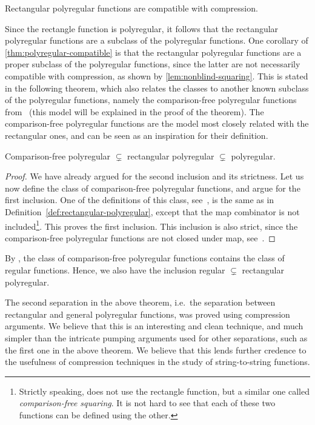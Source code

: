 \documentclass[a4paper,UKenglish,cleveref, autoref, thm-restate]{lipics-v2021}
\begin{document}
\begin{theorem}
    \label{thm:polyregular-compatible}
    Rectangular polyregular functions are compatible with compression.
\end{theorem}
Since the rectangle function is polyregular, it follows that the rectangular polyregular functions are a subclass of the polyregular functions. 
One corollary of \cref{thm:polyregular-compatible} is that the rectangular polyregular functions are a proper subclass of the polyregular functions, since the latter are not necessarily compatible with compression, as shown by \cref{lem:nonblind-squaring}. This is stated in the following theorem, which also relates the classes to another known subclass of the polyregular functions, namely the comparison-free polyregular functions from~\cite{NguyenNP21} (this model  will be explained in the proof of the theorem). The comparison-free polyregular functions are the model most closely related with the rectangular ones, and can be seen as an inspiration for their definition.

\begin{theorem}\label{thm:inclusions-on-classes} Comparison-free polyregular \; $\subsetneq$\; rectangular polyregular \; $\subsetneq$ \; polyregular.
\end{theorem}
\begin{proof}
    We have already argued for the second inclusion and its strictness. Let us now define the class of comparison-free polyregular functions, and argue for the first inclusion. One of the definitions of this class, see~\cite[Theorem~6.1]{NguyenNP21}, is the same as in Definition~\ref{def:rectangular-polyregular}, except that  the map combinator is not included\footnote{Strictly speaking, \cite[Theorem~6.1]{NguyenNP21} does not use the rectangle function, but a similar one called \emph{comparison-free squaring}. It is not hard to see that each of these two functions can be defined using the other. }. This proves the first inclusion. This inclusion is also strict, since  the comparison-free polyregular functions are not closed under map, see~\cite[Corollary~8.5]{NguyenNP21}.
\end{proof}
By \cite[Theorem 6.1]{NguyenNP21}, the class of comparison-free polyregular functions contains the class of regular functions. Hence, we also have the inclusion
regular $\subsetneq$ rectangular polyregular. 

The second  separation in the above theorem, i.e.~the separation between rectangular and general polyregular functions, was proved using compression arguments. We believe that this is an interesting and clean technique, and much simpler than the intricate pumping arguments used for other separations, such as the first one in the above theorem. We believe that this lends further credence to the usefulness of compression techniques in the study of string-to-string functions.
\end{document}

